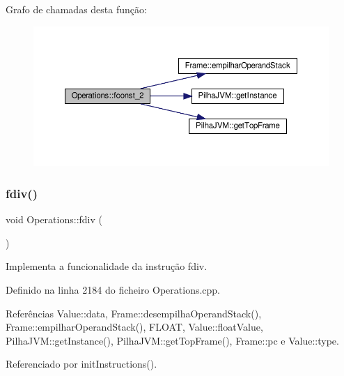 Grafo de chamadas desta função\+:
\nopagebreak
\begin{figure}[H]
\begin{center}
\leavevmode
\includegraphics[width=350pt]{classOperations_a1857c1a0e34d6f91dcb7166ca6d678a2_cgraph}
\end{center}
\end{figure}
\mbox{\label{classOperations_a85d79532189d640a6d02c99f204d2229}} 
\subsubsection{\texorpdfstring{fdiv()}{fdiv()}}
{\footnotesize\ttfamily void Operations\+::fdiv (\begin{DoxyParamCaption}{ }\end{DoxyParamCaption})\hspace{0.3cm}{\ttfamily [private]}}



Implementa a funcionalidade da instrução fdiv. 



Definido na linha 2184 do ficheiro Operations.\+cpp.



Referências Value\+::data, Frame\+::desempilha\+Operand\+Stack(), Frame\+::empilhar\+Operand\+Stack(), F\+L\+O\+AT, Value\+::float\+Value, Pilha\+J\+V\+M\+::get\+Instance(), Pilha\+J\+V\+M\+::get\+Top\+Frame(), Frame\+::pc e Value\+::type.



Referenciado por init\+Instructions().

